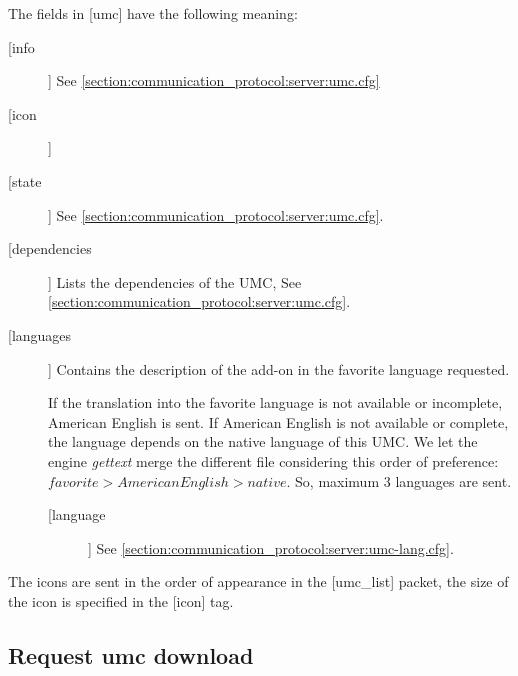 The fields in [umc] have the following meaning:
\begin{description}
\item[[info]]
  See \cref{section:communication_protocol:server:umc.cfg}


\item[[icon]]



\item[[state]]
  See \cref{section:communication_protocol:server:umc.cfg}.

\item[[dependencies]] 
  Lists the dependencies of the UMC, See \cref{section:communication_protocol:server:umc.cfg}.

\item[[languages]]
  Contains the description of the add-on in the favorite language requested.

If the translation into the favorite language is not available or incomplete, American English is sent.
If American English is not available or complete, the language depends on the native language of this UMC. 
We let the engine \textit{gettext} merge the different file considering this order of preference: $favorite >
American English > native$. So, maximum 3 languages are sent.

\begin{description}
\item [[language]] See \cref{section:communication_protocol:server:umc-lang.cfg}.
\end{description}
\end{description}
The icons are sent in the order of appearance in the [umc\_list] packet, the size of the icon is specified in the [icon] tag.

\subsection{Request umc download}
\label{wire:request_umc_download}

